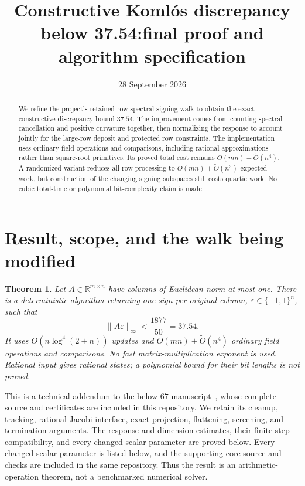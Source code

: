 \documentclass[11pt]{amsart}
\title[Constructive Koml\'os discrepancy: final certificate]{Constructive Koml\'os discrepancy below 37.54:\newline final proof and algorithm specification}
\author{}
\date{28 September 2026}
\newtheorem{theorem}{Theorem}[section]
\theoremstyle{remark}\newtheorem{remark}[theorem]{Remark}
\newcommand{\R}{\mathbb R}
\begin{document}
\begin{abstract}
We refine the project's retained-row spectral signing walk to obtain the
exact constructive discrepancy bound $37.54$. The improvement comes from
counting spectral cancellation and positive curvature together, then
normalizing the response to account jointly for the large-row deposit and protected row constraints.
The implementation uses ordinary field operations and comparisons,
including rational approximations rather than square-root primitives.
Its proved total cost remains $O(mn)+\widetilde O(n^4)$. A randomized
variant reduces all row processing to $O(mn)+\widetilde O(n^3)$ expected
work, but construction of the changing signing subspaces still costs
quartic work. No cubic total-time or polynomial bit-complexity claim is made.
\end{abstract}
\maketitle

\section{Result, scope, and the walk being modified}

\begin{theorem}\label{thm:main41}
Let $A\in\R^{m\times n}$ have columns of Euclidean norm at most one.
There is a deterministic algorithm returning one sign per original column,
$\varepsilon\in\{-1,1\}^n$, such that
\[
 \|A\varepsilon\|_\infty<\frac{1877}{50}=37.54.
\]
It uses $O(n\log^4(2+n))$ updates and
$O(mn)+\widetilde O(n^4)$ ordinary field operations and comparisons.
No fast matrix-multiplication exponent is used. Rational input gives
rational states; a polynomial bound for their bit lengths is not proved.
\end{theorem}

This is a technical addendum to the below-$67$ manuscript~\cite{baseline},
whose complete source and certificates are included in this repository. We retain its cleanup, tracking, rational Jacobi interface,
exact projection, flattening, screening, and termination arguments.
The response and dimension estimates, their finite-step compatibility,
and every changed scalar parameter are proved below. Every changed scalar parameter is
listed below, and the supporting core source and checks are included in
the same repository. Thus the result is
an arithmetic-operation theorem, not a benchmarked numerical solver.
\end{document}
